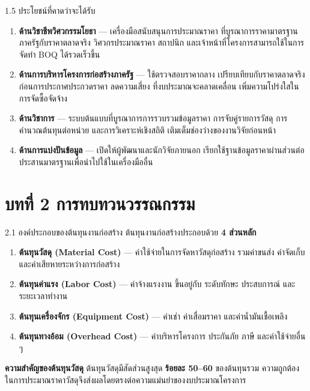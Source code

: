 \documentclass[aspectratio=169,11pt]{beamer}
\begin{document}
\begin{frame}{1.5 ประโยชน์ที่คาดว่าจะได้รับ}
  \begin{enumerate}
    \item \textbf{ด้านวิชาชีพวิศวกรรมโยธา} --- เครื่องมือสนับสนุนการประมาณราคา
          ที่บูรณาการราคามาตรฐานภาครัฐกับราคาตลาดจริง วิศวกรประมาณราคา
          สถาปนิก และเจ้าหน้าที่โครงการสามารถใช้ในการจัดทำ BOQ ได้รวดเร็วขึ้น
    \item \textbf{ด้านการบริหารโครงการก่อสร้างภาครัฐ} --- ใช้ตรวจสอบราคากลาง
          เปรียบเทียบกับราคาตลาดจริงก่อนการประกาศประกวดราคา ลดความเสี่ยง
          ที่งบประมาณจะคลาดเคลื่อน เพิ่มความโปร่งใสในการจัดซื้อจัดจ้าง
    \item \textbf{ด้านวิชาการ} --- ระบบต้นแบบที่บูรณาการการรวบรวมข้อมูลราคา
          การจับคู่รายการวัสดุ การคำนวณต้นทุนต่อหน่วย และการวิเคราะห์เชิงสถิติ
          เติมเต็มช่องว่างของงานวิจัยก่อนหน้า
    \item \textbf{ด้านการแบ่งปันข้อมูล} --- เปิดให้ผู้พัฒนาและนักวิจัยภายนอก
          เรียกใช้ฐานข้อมูลราคาผ่านส่วนต่อประสานมาตรฐานเพื่อนำไปใช้ในเครื่องมืออื่น
  \end{enumerate}
\end{frame}

\section{บทที่ 2 การทบทวนวรรณกรรม}

\begin{frame}{2.1 องค์ประกอบของต้นทุนงานก่อสร้าง}
  ต้นทุนงานก่อสร้างประกอบด้วย \textbf{4 ส่วนหลัก}
  \begin{enumerate}
    \item \textbf{ต้นทุนวัสดุ (Material Cost)} --- ค่าใช้จ่ายในการจัดหาวัสดุก่อสร้าง
          รวมค่าขนส่ง ค่าจัดเก็บ และค่าเสียหายระหว่างการก่อสร้าง
    \item \textbf{ต้นทุนค่าแรง (Labor Cost)} --- ค่าจ้างแรงงาน ขึ้นอยู่กับ
          ระดับทักษะ ประสบการณ์ และระยะเวลาทำงาน
    \item \textbf{ต้นทุนเครื่องจักร (Equipment Cost)} --- ค่าเช่า ค่าเสื่อมราคา
          และค่าน้ำมันเชื้อเพลิง
    \item \textbf{ต้นทุนทางอ้อม (Overhead Cost)} --- ค่าบริหารโครงการ ประกันภัย
          ภาษี และค่าใช้จ่ายอื่น ๆ
  \end{enumerate}
  \vspace{0.3em}
  \begin{block}{\textbf{ความสำคัญของต้นทุนวัสดุ}}
    ต้นทุนวัสดุมีสัดส่วนสูงสุด \textbf{ร้อยละ 50--60} ของต้นทุนรวม ความถูกต้อง
    ในการประมาณราคาวัสดุจึงส่งผลโดยตรงต่อความแม่นยำของงบประมาณโครงการ
  \end{block}
\end{frame}
\end{document}

